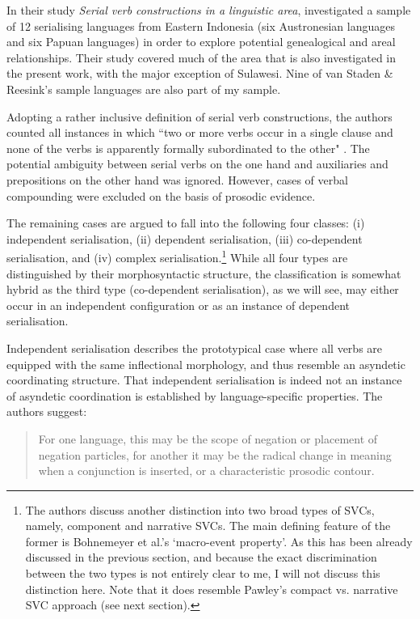 In their study \textit{Serial verb constructions in a linguistic area}, \citet{vanstaden2008serial} investigated a sample of 12 serialising languages from Eastern Indonesia (six Austronesian languages and six Papuan languages) in order to explore potential genealogical and areal relationships. Their study covered much of the area that is also investigated in the present work, with the major exception of Sulawesi. Nine of van Staden \& Reesink's sample languages are also part of my sample. 

Adopting a rather inclusive definition of serial verb constructions, the authors counted all instances in which ``two or more verbs occur in a single clause and none of the verbs is apparently formally subordinated to the other" \citep[22]{vanstaden2008serial}. The potential ambiguity between serial verbs on the one hand and auxiliaries and prepositions on the other hand was ignored. However, cases of verbal compounding were excluded on the basis of prosodic evidence. 

The remaining cases are argued to fall into the following four classes: (i) independent serialisation, (ii) dependent serialisation, (iii) co-dependent serialisation, and (iv) complex serialisation.\footnote{The authors discuss another distinction into two broad types of SVCs, namely, component and narrative SVCs. The main defining feature of the former is Bohnemeyer et al.'s `macro-event property'. As this has been already discussed in the previous section, and because the exact discrimination between the two types is not entirely clear to me, I will not discuss this distinction here. Note that it does resemble Pawley's compact vs. narrative SVC approach (see next section).} While all four types are distinguished by their morphosyntactic structure, the classification is somewhat hybrid as the third type (co-dependent serialisation), as we will see, may either occur in an independent configuration or as an instance of dependent serialisation.

Independent serialisation describes the prototypical case where all verbs are equipped with the same inflectional morphology, and thus resemble an asyndetic coordinating structure. That independent serialisation is indeed not an instance of asyndetic coordination is established by language-specific properties. The authors suggest:

\begin{quote}For one language, this may be the scope of negation or placement of negation particles, for another it may be the radical change in meaning when a conjunction is inserted, or a characteristic prosodic contour. \citep[23]{vanstaden2008serial}\end{quote}

